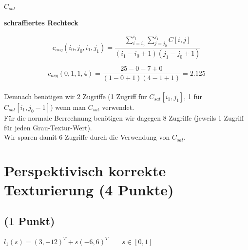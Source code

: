 \documentclass[a4paper,10pt,DIV=14]{article}
\begin{document}
$C_{sat}$\\


\textbf{schraffiertes Rechteck}\\


\[c_{avg}(i_0,j_0,i_1,j_1) = \frac{\sum_{i=i_{0}}^{i_{1}} \sum_{j=j_{0}}^{j_{1}}  C[i,j]}{(i_{1}-i_{0}+1)(j_{1}-j_{0}+1)}\]

\[c_{avg}(0,1,1,4) = \frac{25 - 0 - 7 + 0}{(1-0+1)(4-1+1)} = 2.125\]\\
Demnach benötigen wir 2 Zugriffe (1 Zugriff für $C_{sat}[i_{1},j_{1}]$, 1 für $C_{sat}[i_{1},j_{0}-1]$) wenn man $C_{sat}$ verwendet.\\
Für die normale Berrechnung benötigen wir dagegen 8 Zugriffe (jeweils 1 Zugriff für jeden Grau-Textur-Wert).\\
Wir sparen damit 6 Zugriffe durch die Verwendung von $C_{sat}$.


\section{Perspektivisch korrekte Texturierung (4 Punkte)}

\subsection{(1 Punkt)}
$l_1(s) = (3, -12)^T + s(-6, 6)^T \qquad s \in [0,1]$ \\
\end{document}
